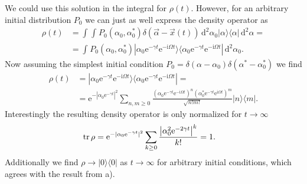 \documentclass[english, parskip=full]{scrartcl}
\newcommand{\intx}{}
\newcommand{\kla}{}
\newcommand{\oper}{}
\newcommand{\tecxt}{}
\renewcommand{\i}{\text{i}}
\newcommand{\e}{\text{e}}
\begin{document}
We could use this solution in the integral for $\rho(t)$.
However, for an arbitrary initial distribution $P_0$ we can just as well express the density operator as
\begin{align}
\rho(t) &= \intx\int_{ }^{ } \intx\int_{ }^{ } P_0(\alpha_0,\alpha_0^\ast) \delta \kla\left( \vec{\alpha} - \vec{x}(t) \right) \, \mathrm{d}^2 \alpha_0 \oper | \alpha \rangle\langle \alpha | \, \mathrm{d}^2 \alpha = \\
&= \intx\int_{ }^{ } P_0(\alpha_0, \alpha_0^\ast) \oper | \alpha_0\e^{-\gamma t}\e^{-\i\Omega t} \rangle\langle \alpha_0\e^{-\gamma t}\e^{-\i\Omega t} | \, \mathrm{d}^2 \alpha_0.
\end{align}
Now assuming the simplest initial condition $P_0 = \delta (\alpha - \alpha_0)\delta (\alpha^\ast - \alpha_0^\ast )$ we find
\begin{align}
\rho (t) &= \oper | \alpha_0\e^{-\gamma t}\e^{-\i\Omega t} \rangle\langle \alpha_0\e^{-\gamma t}\e^{-\i\Omega t} | = \\
&= \e^{-|\alpha_0\e^{-\gamma t} |^2} \sum_{n,m\ge 0} \frac{\kla\left( \alpha_0\e^{-\gamma t}\e^{-\i\Omega t} \right)^n (\alpha_0^\ast\e^{-\gamma t}\e^{\i\Omega t})^m}{\sqrt{n!m!}} \oper | n \rangle\langle m |.
\end{align}
Interestingly the resulting density operator is only normalized for $t\rightarrow\infty $
\begin{align}
\tecxt\text{tr\,}\rho &= \e^{-|\alpha_0\e^{-\gamma t} |^2} \sum_{k\ge 0} \frac{ \left\vert  \alpha_0^2 \e^{-2\gamma t} \right\vert^k }{k!} = 1.
\end{align}
Additionally we find $\rho \rightarrow \oper | 0 \rangle\langle 0 |$ as $t\rightarrow\infty$ for arbitrary initial conditions, which agrees with the result from a).
\end{document}
